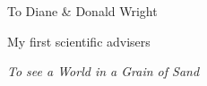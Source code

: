 \begin{center}
    To Diane \& Donald Wright

    My first scientific advisers


    \emph{To see a World in a Grain of Sand}
\end{center}
